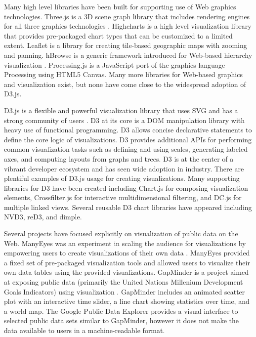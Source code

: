 Many high level libraries have been built for supporting use of Web graphics technologies. Three.js is a 3D scene graph library that includes rendering engines for all three graphics technologies \cite{cabello2010three}. Highcharts is a high level visualization library that provides pre-packaged chart types that can be customized to a limited extent. Leaflet is a library for creating tile-based geographic maps with zooming and panning. hBrowse is a generic framework introduced for Web-based hierarchy visualization \cite{kokoszkiewicz2012hbrowse}. Processing.js is a JavaScript port of the graphics language Processing using HTML5 Canvas. Many more libraries for Web-based graphics and visualization exist, but none have come close to the widespread adoption of D3.js.

D3.js is a flexible and powerful visualization library that uses SVG and has a strong community of users \cite{d3}. D3 at its core is a DOM manipulation library with heavy use of functional programming. D3 allows concise declarative statements to define the core logic of visualizations. D3 provides additional APIs for performing common visualization tasks such as defining and using scales, generating labeled axes, and computing layouts from graphs and trees. D3 is at the center of a vibrant developer ecosystem and has seen wide adoption in industry. There are plentiful examples of D3.js usage for creating visualizations. Many supporting libraries for D3 have been created including Chart.js for composing visualization elements, Crossfilter.js for interactive multidimensional filtering, and DC.js for multiple linked views. Several reusable D3 chart libraries have appeared including NVD3, reD3, and dimple.

%
Several projects have focused explicitly on visualization of public data on the Web. ManyEyes was an experiment in scaling the audience for visualizations by empowering users to create visualizations of their own data \cite{viegas2007manyeyes}. ManyEyes provided a fixed set of pre-packaged visualization tools and allowed users to visualize their own data tables using the provided visualizations. GapMinder is a project aimed at exposing public data (primarily the United Nations Millenium Development Goals Indicators) using visualization \cite{rosling2005new}. GapMinder includes an animated scatter plot with an interactive time slider, a line chart showing statistics over time, and a world map. The Google Public Data Explorer provides a visual interface to selected public data sets similar to GapMinder, however it does not make the data available to users in a machine-readable format.

